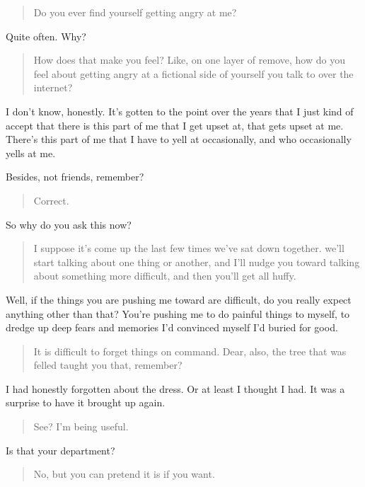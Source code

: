 \begin{quote}
Do you ever find yourself getting angry at me?
\end{quote}

Quite often. Why?

\begin{quote}
How does that make you feel? Like, on one layer of remove, how do you feel about getting angry at a fictional side of yourself you talk to over the internet?
\end{quote}

I don't know, honestly. It's gotten to the point over the years that I just kind of accept that there is this part of me that I get upset at, that gets upset at me. There's this part of me that I have to yell at occasionally, and who occasionally yells at me.

Besides, not friends, remember?

\begin{quote}
Correct.
\end{quote}

So why do you ask this now?

\begin{quote}
I suppose it's come up the last few times we've sat down together. we'll start talking about one thing or another, and I'll nudge you toward talking about something more difficult, and then you'll get all huffy.
\end{quote}

Well, if the things you are pushing me toward are difficult, do you really expect anything other than that? You're pushing me to do painful things to myself, to dredge up deep fears and memories I'd convinced myself I'd buried for good.

\begin{quote}
It is difficult to forget things on command. Dear, also, the tree that was felled taught you that, remember?
\end{quote}

I had honestly forgotten about the dress. Or at least I thought I had. It was a surprise to have it brought up again.

\begin{quote}
See? I'm being useful.
\end{quote}

Is that your department?

\begin{quote}
No, but you can pretend it is if you want.
\end{quote}

